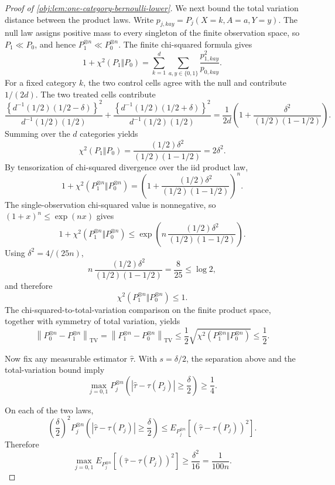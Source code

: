 \documentclass[11pt]{article}
\begin{document}
\begin{proof}[Proof of \cref{obj:lem:one-category-bernoulli-lower}]
We next bound the total variation distance between the product laws. Write
\(p_{j,kay}=P_j(X=k,A=a,Y=y)\). The null law assigns positive mass to every singleton of the finite observation space, so \(P_1\ll P_0\), and hence \(P_1^{\otimes n}\ll P_0^{\otimes n}\). The finite chi-squared formula gives
\[
1+\chi^2(P_1\Vert P_0)
=\sum_{k=1}^d\sum_{a,y\in\{0,1\}}\frac{p_{1,kay}^2}{p_{0,kay}} .
\]
For a fixed category \(k\), the two control cells agree with the null and contribute \(1/(2d)\). The two treated cells contribute
\[
\frac{\left\{d^{-1}(1/2)(1/2-\delta)\right\}^2}{d^{-1}(1/2)(1/2)}
+
\frac{\left\{d^{-1}(1/2)(1/2+\delta)\right\}^2}{d^{-1}(1/2)(1/2)}
=
\frac{1}{2d}\left(1+\frac{\delta^2}{(1/2)(1-1/2)}\right).
\]
Summing over the \(d\) categories yields
\[
\chi^2(P_1\Vert P_0)
=
\frac{(1/2)\delta^2}{(1/2)(1-1/2)}
=2\delta^2 .
\]
By tensorization of chi-squared divergence over the iid product law,
\[
1+\chi^2\!\left(P_1^{\otimes n}\Vert P_0^{\otimes n}\right)
=
\left(1+\frac{(1/2)\delta^2}{(1/2)(1-1/2)}\right)^n .
\]
The single-observation chi-squared value is nonnegative, so \((1+x)^n\le \exp(nx)\) gives
\[
1+\chi^2\!\left(P_1^{\otimes n}\Vert P_0^{\otimes n}\right)
\le
\exp\!\left(
n\,\frac{(1/2)\delta^2}{(1/2)(1-1/2)}
\right).
\]
Using \(\delta^2=4/(25n)\),
\[
n\,\frac{(1/2)\delta^2}{(1/2)(1-1/2)}
=
\frac{8}{25}
\le
\log 2,
\]
and therefore
\[
\chi^2\!\left(P_1^{\otimes n}\Vert P_0^{\otimes n}\right)\le1.
\]
The chi-squared-to-total-variation comparison on the finite product space, together with symmetry of total variation, yields
\[
\left\|P_0^{\otimes n}-P_1^{\otimes n}\right\|_{\mathrm{TV}}
=
\left\|P_1^{\otimes n}-P_0^{\otimes n}\right\|_{\mathrm{TV}}
\le
\frac12\sqrt{\chi^2\!\left(P_1^{\otimes n}\Vert P_0^{\otimes n}\right)}
\le
\frac12 .
\]

Now fix any measurable estimator \(\widehat\tau\). With \(s=\delta/2\), the separation above and the total-variation bound imply
\[
\max_{j=0,1}
P_j^{\otimes n}\left(
|\widehat\tau-\tau(P_j)|\ge \frac{\delta}{2}
\right)
\ge \frac14 .
\]

On each of the two laws,
\[
\left(\frac{\delta}{2}\right)^2
P_j^{\otimes n}\left(
|\widehat\tau-\tau(P_j)|\ge \frac{\delta}{2}
\right)
\le
E_{P_j^{\otimes n}}\!\left[(\widehat\tau-\tau(P_j))^2\right].
\]
Therefore
\[
\max_{j=0,1}
E_{P_j^{\otimes n}}\!\left[(\widehat\tau-\tau(P_j))^2\right]
\ge
\frac{\delta^2}{16}
=
\frac{1}{100n}.
\]


\end{proof}
\end{document}
